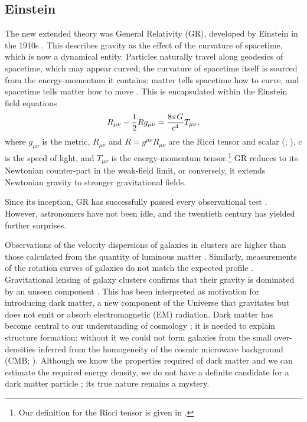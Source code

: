 \subsection{Einstein}

The new extended theory was General Relativity (GR), developed by Einstein in the 1910s \citep{Einstein1997}. This describes gravity as the effect of the curvature of spacetime, which is now a dynamical entity. Particles naturally travel along geodesics of spacetime, which may appear curved; the curvature of spacetime itself is sourced from the energy-momentum it contains: matter tells spacetime how to curve, and spacetime tells matter how to move \citep[section 1.1]{Misner1973}. This is encapsulated within the Einstein field equations \citep[documents 22, 25]{Einstein1997}
\begin{equation}
R_{\mu\nu} - \dfrac{1}{2}R g_{\mu\nu} = \dfrac{8\pi G}{c^4}T_{\mu\nu},
\end{equation}
where $g_{\mu\nu}$ is the metric, $R_{\mu\nu}$ and $R = g^{\mu\nu}R_{\mu\nu}$ are the Ricci tensor and scalar (\citealt[section 8.7]{Misner1973}; \citealt[section 3.2]{Wald1984}), $c$ is the speed of light, and $T_{\mu\nu}$ is the energy-momentum tensor.\footnote{Our definition for the Ricci tensor is given in .} GR reduces to its Newtonian counter-part in the weak-field limit, or conversely, it extends Newtonian gravity to stronger gravitational fields.

Since its inception, GR has successfully passed every observational test \citep{Will1993, Will2006}. However, astronomers have not been idle, and the twentieth century has yielded further surprises.

Observations of the velocity dispersions of galaxies in clusters are higher than those calculated from the quantity of luminous matter \citep[e.g.,][]{Zwicky1937}. Similarly, measurements of the rotation curves of galaxies do not match the expected profile \citep{Babcock1939}. Gravitational lensing of galaxy clusters confirms that their gravity is dominated by an unseen component \citep{Bergmann1990,Clowe2006}. This has been interpreted as motivation for introducing dark matter, a new component of the Universe that gravitates but does not emit or absorb electromagnetic (EM) radiation. Dark matter has become central to our understanding of cosmology \citep[e.g.,][]{Springel2006a}; it is needed to explain structure formation: without it we could not form galaxies from the small over-densities inferred from the homogeneity of the cosmic microwave background (CMB; \citealt{White1978,Liddle1993}). Although we know the properties required of dark matter and we can estimate the required energy density, we do not have a definite candidate for a dark matter particle \citep{Bertone2005}; its true nature remains a mystery.

